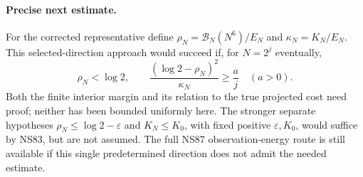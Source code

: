 \paragraph{Precise next estimate.}
For the corrected representative define
$\rho_N=\mathcal B_N(N^6)/E_N$ and $\kappa_N=K_N/E_N$.
This selected-direction approach would succeed if, for $N=2^j$ eventually,
\[
 \rho_N<\log2,\qquad
 \frac{(\log2-\rho_N)^2}{\kappa_N}\ge\frac a j
 \quad(a>0).
\]
Both the finite interior margin and its relation to the true projected
cost need proof; neither has been bounded uniformly here. The stronger
separate hypotheses $\rho_N\le\log2-\varepsilon$ and $K_N\le K_0$,
with fixed positive $\varepsilon,K_0$, would suffice by NS83, but are not
assumed. The full NS87 observation-energy route is still available if
this single predetermined direction does not admit the needed estimate.
